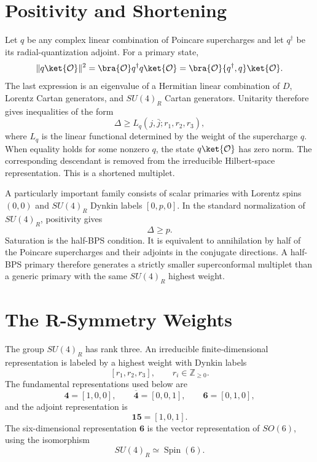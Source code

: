 \section{Positivity and Shortening}

Let \(q\) be any complex linear combination of Poincare supercharges and let
\(q^\dagger\) be its radial-quantization adjoint.  For a primary state,
\[
  \|q\ket{\mathcal O}\|^2
  =
  \bra{\mathcal O}q^\dagger q\ket{\mathcal O}
  =
  \bra{\mathcal O}\{q^\dagger,q\}\ket{\mathcal O}.
\]
The last expression is an eigenvalue of a Hermitian linear combination of
\(D\), Lorentz Cartan generators, and \(SU(4)_R\) Cartan generators.  Unitarity
therefore gives inequalities of the form
\begin{equation}
  \Delta\ge L_q(j,\bar j;r_1,r_2,r_3),
  \label{eq:superconformal-positivity-bound}
\end{equation}
where \(L_q\) is the linear functional determined by the weight of the
supercharge \(q\).  When equality holds for some nonzero \(q\), the state
\(q\ket{\mathcal O}\) has zero norm.  The corresponding descendant is removed
from the irreducible Hilbert-space representation.  This is a shortened
multiplet.

A particularly important family consists of scalar primaries with Lorentz
spins \((0,0)\) and \(SU(4)_R\) Dynkin labels \([0,p,0]\).  In the standard
normalization of \(SU(4)_R\), positivity gives
\begin{equation}
  \Delta\ge p.
  \label{eq:half-bps-bound}
\end{equation}
Saturation is the half-BPS condition.  It is equivalent to annihilation by
half of the Poincare supercharges and their adjoints in the conjugate
directions.  A half-BPS primary therefore generates a strictly smaller
superconformal multiplet than a generic primary with the same \(SU(4)_R\)
highest weight.

\section{The R-Symmetry Weights}

The group \(SU(4)_R\) has rank three.  An irreducible finite-dimensional
representation is labeled by a highest weight with Dynkin labels
\[
  [r_1,r_2,r_3],
  \qquad
  r_i\in\mathbb Z_{\ge0}.
\]
The fundamental representations used below are
\[
  \mathbf4=[1,0,0],
  \qquad
  \overline{\mathbf4}=[0,0,1],
  \qquad
  \mathbf6=[0,1,0],
\]
and the adjoint representation is
\[
  \mathbf{15}=[1,0,1].
\]
The six-dimensional representation \(\mathbf6\) is the vector
representation of \(SO(6)\), using the isomorphism
\[
  SU(4)_R\simeq \operatorname{Spin}(6).
\]

